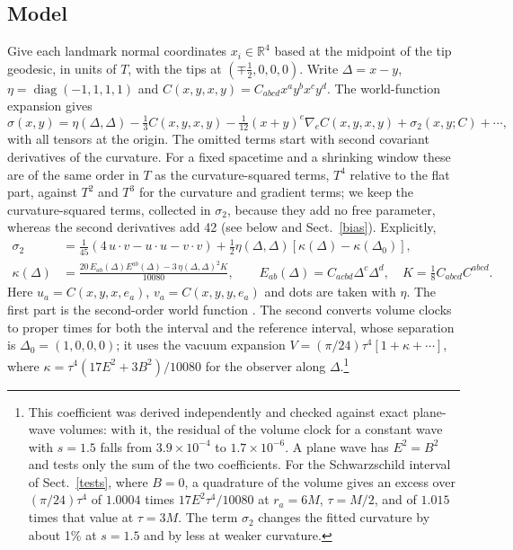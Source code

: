 \documentclass[11pt,a4paper]{article}
\begin{document}
\subsection{Model}
Give each landmark normal coordinates $x_i\in\mathbb R^4$ based at the
midpoint of the tip geodesic, in units of $T$, with the tips at
$(\mp\tfrac12,0,0,0)$. Write $\Delta=x-y$, $\eta=\operatorname{diag}(-1,1,1,1)$
and $C(x,y,x,y)=C_{abcd}x^ay^bx^cy^d$. The world-function expansion
\cite{brewin} gives
\begin{equation}
 \sigma(x,y)=\eta(\Delta,\Delta)-\tfrac13C(x,y,x,y)
 -\tfrac1{12}(x+y)^e\nabla_eC(x,y,x,y)+\sigma_2(x,y;C)+\cdots,
 \label{model}
\end{equation}
with all tensors at the origin. The omitted terms start with second
covariant derivatives of the curvature. For a fixed spacetime and a
shrinking window these are of the same order in $T$ as the
curvature-squared terms, $T^4$ relative to the flat part, against $T^2$ and
$T^3$ for the curvature and gradient terms; we keep the curvature-squared
terms, collected in $\sigma_2$,
because they add no free parameter, whereas the second derivatives add 42
(see below and Sect.~\ref{bias}). Explicitly,
\begin{align}
 \sigma_2&=\tfrac1{45}\left(4\,u\!\cdot\!v-u\!\cdot\!u-v\!\cdot\!v\right)
 +\tfrac12\eta(\Delta,\Delta)\left[\kappa(\Delta)-\kappa(\Delta_0)\right],\nonumber\\
 \kappa(\Delta)&=\frac{20\,E_{ab}(\Delta)E^{ab}(\Delta)-3\,\eta(\Delta,\Delta)^2K}{10080},
 \qquad E_{ab}(\Delta)=C_{acbd}\Delta^c\Delta^d,\quad
 K=\tfrac18C_{abcd}C^{abcd}. \label{square}
\end{align}
Here $u_a=C(x,y,x,e_a)$, $v_a=C(x,y,y,e_a)$ and dots are taken with $\eta$.
The first part is the second-order world function \cite{brewin}. The second
converts volume clocks to proper times for both the interval and the
reference interval, whose separation is $\Delta_0=(1,0,0,0)$; it uses the
vacuum expansion $V=(\pi/24)\tau^4[1+\kappa+\cdots]$, where
$\kappa=\tau^4(17E^2+3B^2)/10080$ for the observer along
$\Delta$.\footnote{This coefficient was derived independently and checked
against exact plane-wave volumes: with it, the residual of the volume clock
for a constant wave with $s=1.5$ falls from $3.9\times10^{-4}$ to
$1.7\times10^{-6}$. A plane wave has $E^2=B^2$ and tests only the sum of
the two coefficients. For the Schwarzschild interval of Sect.~\ref{tests},
where $B=0$, a quadrature of the volume gives an excess over
$(\pi/24)\tau^4$ of $1.0004$ times $17E^2\tau^4/10080$ at $r_a=6M$,
$\tau=M/2$, and of $1.015$ times that value at $\tau=3M$. The term $\sigma_2$
changes the fitted curvature by about 1\% at $s=1.5$ and by less at weaker
curvature.}
\end{document}
